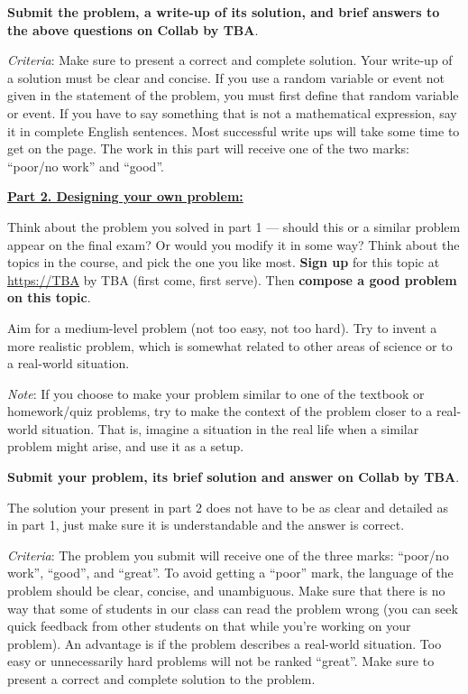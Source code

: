 \documentclass[oneside,11pt]{amsart}
\newcommand{\razdel}[1]{\smallskip\underline{\textbf{#1:}}\smallskip}
\begin{document}
\textbf{Submit the problem, a write-up of its solution, and brief answers to the above questions on Collab by TBA}.

\emph{Criteria}: 
Make sure to present a correct and complete solution.
Your write-up of a solution 
must be clear and concise. If you use a random variable or event not given 
in the statement of the problem, you must first define that random variable or event. 
If you have to say something that is not a mathematical expression, say it in complete English sentences. 
Most successful write ups will take some time to get on the page.
The work in this part will receive one of the two marks:
``poor/no work'' and ``good''.

\razdel{Part 2. Designing your own problem}

Think about the problem you solved in part 1 --- should this or a similar
problem appear on the final exam? Or would you modify it in some way?
Think about the topics in the course, and pick the one you like most. 
\textbf{Sign up} for this topic at
\url{https://TBA} by TBA (first come, first serve).
Then \textbf{compose a good problem on this topic}. 

Aim for a medium-level problem (not too easy, not too hard). 
Try to invent a more realistic problem, which is somewhat related to 
other areas of science or to a real-world situation.

\emph{Note}: If you choose to make your problem similar to one of the textbook
or homework/quiz problems, try to make the context of the problem
closer to a real-world situation. That is, imagine a situation in the real life
when a similar problem might arise, and use it as a setup.

\textbf{Submit your problem, its brief solution and answer on Collab by TBA}.

The solution your present in part 2 does not have to be as clear and 
detailed as in part 1, just make sure it is understandable
and the answer is correct.

\emph{Criteria}: 
The problem you submit will receive one of the three marks:
``poor/no work'', ``good'', and ``great''.
To avoid getting a ``poor'' mark,
the language of the problem should be clear, concise, and unambiguous.
Make sure that there is no way that some of students in our class
can read the problem wrong (you can seek quick feedback from other students on that
while you're working on your problem). 
An advantage is if the problem describes a real-world situation. 
Too easy or unnecessarily hard 
problems will not be ranked ``great''.
Make sure to present a correct and complete solution to the problem.
\end{document}
